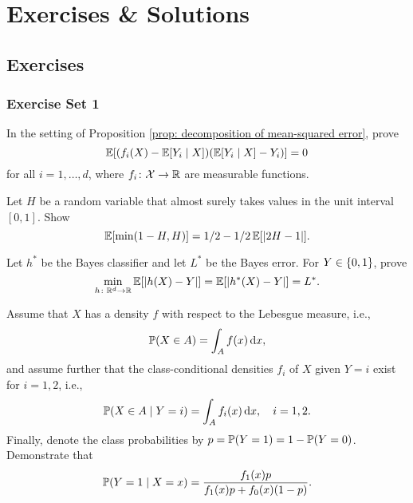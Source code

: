 \part{Exercises \& Solutions}

\chapter{Exercises}

\section{Exercise Set 1}

\begin{exercise}
In the setting of Proposition \ref{prop: decomposition of mean-squared error}, prove
\[
    \Exp[(f_i(X) - \Exp[Y_i \given X]) (\Exp[Y_i \given X] - Y_i)] = 0
\]
for all $i = 1, \dots, d$, where $f_i \colon \mathcal{X} \to \R$ are measurable functions.
\end{exercise}


\begin{exercise}
Let $H$ be a random variable that almost surely takes values in the unit interval $[0, 1]$. Show
\[
    \Exp[\min(1-H, H)] = 1/2 - 1/2 \Exp[\abs{2H - 1}].
\]
\end{exercise}


\begin{exercise}
Let $h^*$ be the Bayes classifier and let $L^*$ be the Bayes error. For $Y \in \set{0, 1}$, prove
\[
    \min_{h \colon \R^d \to \R} \Exp[\abs{h(X) - Y}] = \Exp[\abs{h^*(X) - Y}] = L^*.
\]
\end{exercise}


\begin{exercise}
Assume that $X$ has a density $f$ with respect to the Lebesgue measure, i.e.,
\[
    \P(X \in A) = \int_A f(x) \dx,
\]
and assume further that the class-conditional densities $f_i$ of $X$ given $Y = i$ exist for $i = 1, 2$, i.e.,
\[
    \P(X \in A \given Y = i) = \int_A f_i(x) \dx, \quad i = 1, 2.
\]
Finally, denote the class probabilities by $p = \P(Y = 1) = 1 - \P(Y = 0)$. Demonstrate that
\[
    \P(Y = 1 \given X = x) = \frac{f_1(x)p}{f_1(x)p + f_0(x) (1-p)}.
\]
\end{exercise}
